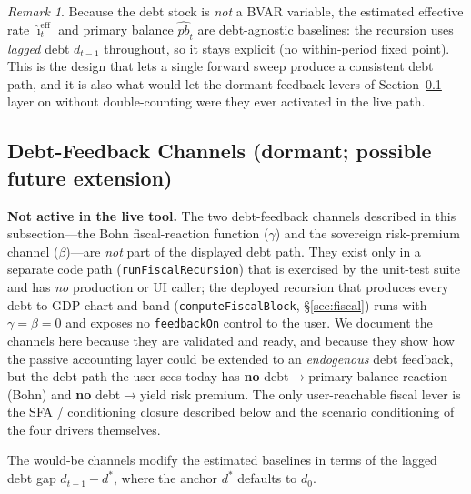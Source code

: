 \documentclass[11pt]{article}
\theoremstyle{definition}
\theoremstyle{remark}
\newtheorem{remark}{Remark}
\begin{document}
\begin{remark}
Because the debt stock is \emph{not} a BVAR variable, the estimated
effective rate $\hat\imath^{\text{eff}}_t$ and primary balance
$\widehat{\mathit{pb}}_t$ are debt-agnostic baselines: the recursion uses
\emph{lagged} debt $d_{t-1}$ throughout, so it stays explicit (no
within-period fixed point).  This is the design that lets a single
forward sweep produce a consistent debt path, and it is also what would
let the dormant feedback levers of Section~\ref{sec:fiscal_levers} layer
on without double-counting were they ever activated in the live path.
\end{remark}

\subsection{Debt-Feedback Channels (dormant; possible future
extension)}\label{sec:fiscal_levers}

\begin{important}
\textbf{Not active in the live tool.}  The two debt-feedback channels
described in this subsection---the Bohn fiscal-reaction function
($\gamma$) and the sovereign risk-premium channel ($\beta$)---are
\emph{not} part of the displayed debt path.  They exist only in a
separate code path (\texttt{runFiscalRecursion}) that is exercised by the
unit-test suite and has \emph{no} production or UI caller; the deployed
recursion that produces every debt-to-GDP chart and band
(\texttt{computeFiscalBlock}, \S\ref{sec:fiscal}) runs with
$\gamma = \beta = 0$ and exposes no \texttt{feedbackOn} control to the
user.  We document the channels here because they are validated and
ready, and because they show how the passive accounting layer could be
extended to an \emph{endogenous} debt feedback, but the debt path the
user sees today has \textbf{no} debt$\to$primary-balance reaction
(Bohn) and \textbf{no} debt$\to$yield risk premium.  The only
user-reachable fiscal lever is the SFA / conditioning closure described
below and the scenario conditioning of the four drivers themselves.
\end{important}

The would-be channels modify the estimated baselines in terms of the
lagged debt gap $d_{t-1} - d^{*}$, where the anchor $d^{*}$ defaults to
$d_0$.
\end{document}
